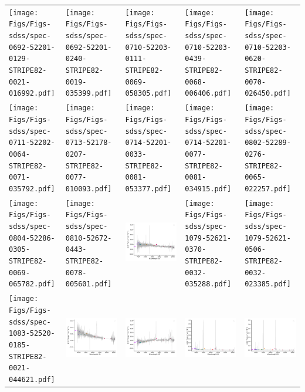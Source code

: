 \begin{center}
\begin{longtable}{l l l l l }
    \texttt{[image: Figs/Figs-sdss/spec-0692-52201-0129-STRIPE82-0021-016992.pdf]} & \texttt{[image: Figs/Figs-sdss/spec-0692-52201-0240-STRIPE82-0019-035399.pdf]} & \texttt{[image: Figs/Figs-sdss/spec-0710-52203-0111-STRIPE82-0069-058305.pdf]} & \texttt{[image: Figs/Figs-sdss/spec-0710-52203-0439-STRIPE82-0068-006406.pdf]} & \texttt{[image: Figs/Figs-sdss/spec-0710-52203-0620-STRIPE82-0070-026450.pdf]} \\
    \texttt{[image: Figs/Figs-sdss/spec-0711-52202-0064-STRIPE82-0071-035792.pdf]} & \texttt{[image: Figs/Figs-sdss/spec-0713-52178-0207-STRIPE82-0077-010093.pdf]} & \texttt{[image: Figs/Figs-sdss/spec-0714-52201-0033-STRIPE82-0081-053377.pdf]} & \texttt{[image: Figs/Figs-sdss/spec-0714-52201-0077-STRIPE82-0081-034915.pdf]} & \texttt{[image: Figs/Figs-sdss/spec-0802-52289-0276-STRIPE82-0065-022257.pdf]} \\
    \texttt{[image: Figs/Figs-sdss/spec-0804-52286-0305-STRIPE82-0069-065782.pdf]} & \texttt{[image: Figs/Figs-sdss/spec-0810-52672-0443-STRIPE82-0078-005601.pdf]} & \includegraphics[width=0.19\linewidth, clip]{Figs/Figs-sdss/spec-0914-52721-0103-SPLUS-n03s44-026823.pdf} & \texttt{[image: Figs/Figs-sdss/spec-1079-52621-0370-STRIPE82-0032-035288.pdf]} & \texttt{[image: Figs/Figs-sdss/spec-1079-52621-0506-STRIPE82-0032-023385.pdf]} \\
    \texttt{[image: Figs/Figs-sdss/spec-1083-52520-0185-STRIPE82-0021-044621.pdf]} & \includegraphics[width=0.19\linewidth, clip]{Figs/Figs-sdss/spec-1085-52531-0175-STRIPE82-0017-027488.pdf} & \includegraphics[width=0.19\linewidth, clip]{Figs/Figs-sdss/spec-1086-52525-0146-STRIPE82-0013-036763.pdf} & \includegraphics[width=0.19\linewidth, clip]{Figs/Figs-sdss/spec-1089-52913-0196-STRIPE82-0007-024265.pdf} & \includegraphics[width=0.19\linewidth, clip]{Figs/Figs-sdss/spec-1089-52913-0199-STRIPE82-0007-023673.pdf} \\

\end{longtable}
\end{center}
